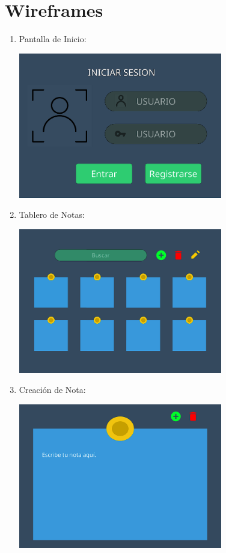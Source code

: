 \section*{Wireframes}
\begin{enumerate}
  \item Pantalla de Inicio:
  \begin{center}
    \includegraphics[width=0.7\textwidth]{IMA/wireframe_inicio_noteboard.png}
  \end{center}
  
  \item Tablero de Notas:
  \begin{center}
    \includegraphics[width=0.7\textwidth]{IMA/wireframe_tablero_noteboard.png}
  \end{center}
  
  \item Creación de Nota:
  \begin{center}
    \includegraphics[width=0.7\textwidth]{IMA/wireframe_creacion_nota_noteboard.png}
  \end{center}
\end{enumerate}


